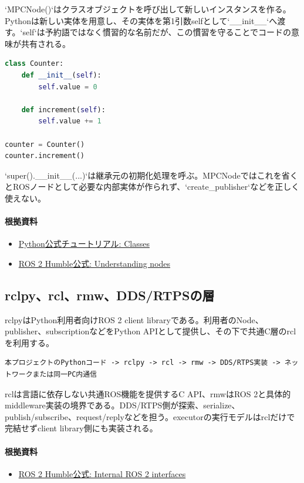 \documentclass[a4paper,11pt]{article}
\begin{document}
`MPCNode()`はクラスオブジェクトを呼び出して新しいインスタンスを作る。Pythonは新しい実体を用意し、その実体を第1引数selfとして`\_\_init\_\_`へ渡す。`self`は予約語ではなく慣習的な名前だが、この慣習を守ることでコードの意味が共有される。


\begin{lstlisting}[language=python]
class Counter:
    def __init__(self):
        self.value = 0

    def increment(self):
        self.value += 1

counter = Counter()
counter.increment()
\end{lstlisting}


`super().\_\_init\_\_(...)`は継承元の初期化処理を呼ぶ。MPCNodeではこれを省くとROSノードとして必要な内部実体が作られず、`create\_publisher`などを正しく使えない。

\paragraph{根拠資料}
\begin{itemize}[leftmargin=1.6em]
\item \href{https://docs.python.org/3/tutorial/classes.html}{Python公式チュートリアル: Classes}
\item \href{https://docs.ros.org/en/humble/Tutorials/Beginner-CLI-Tools/Understanding-ROS2-Nodes/Understanding-ROS2-Nodes.html}{ROS 2 Humble公式: Understanding nodes}
\end{itemize}

\subsection{rclpy、rcl、rmw、DDS/RTPSの層}
rclpyはPython利用者向けROS 2 client libraryである。利用者のNode、publisher、subscriptionなどをPython APIとして提供し、その下で共通C層のrclを利用する。


\begin{lstlisting}
本プロジェクトのPythonコード -> rclpy -> rcl -> rmw -> DDS/RTPS実装 -> ネットワークまたは同一PC内通信
\end{lstlisting}


rclは言語に依存しない共通ROS機能を提供するC API、rmwはROS 2と具体的middleware実装の境界である。DDS/RTPS側が探索、serialize、publish/subscribe、request/replyなどを担う。executorの実行モデルはrclだけで完結せずclient library側にも実装される。

\paragraph{根拠資料}
\begin{itemize}[leftmargin=1.6em]
\item \href{https://docs.ros.org/en/humble/Concepts/About-Internal-Interfaces.html}{ROS 2 Humble公式: Internal ROS 2 interfaces}
\end{itemize}
\end{document}
